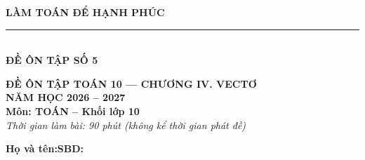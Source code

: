 \documentclass[10pt,a4paper]{article}
\begin{document}
\noindent
\begin{minipage}[c]{0.38\textwidth}
    \centering
    \textbf{LÀM TOÁN ĐỂ HẠNH PHÚC}\\[-2pt]
    \rule{3.2cm}{0.6pt}\\[2pt]
    \textbf{ĐỀ ÔN TẬP SỐ 5}
\end{minipage}\hfill
\begin{minipage}[c]{0.52\textwidth}
    \centering
    \textbf{ĐỀ ÔN TẬP TOÁN 10 — CHƯƠNG IV. VECTƠ}\\[1pt]
    \textbf{NĂM HỌC 2026 -- 2027}\\[1pt]
    \textbf{Môn: TOÁN -- Khối lớp 10}\\
    \textit{\small Thời gian làm bài: 90 phút (không kể thời gian phát đề)}
\end{minipage}

\vspace{0.05cm}
\noindent
\begin{minipage}[b]{0.78\textwidth}
    \textbf{Họ và tên:}\dotfill\textbf{SBD:}\makebox[3.5cm]{\dotfill}
\end{minipage}\hfill
\begin{minipage}[b]{0.20\textwidth}
    \hfill
    \setlength{\fboxrule}{0.8pt}%
\end{minipage}
\vspace{0.05cm}
\end{document}
